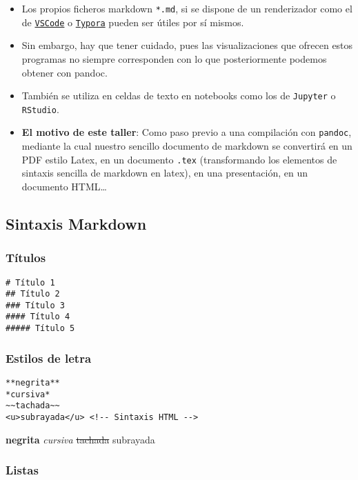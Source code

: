 \documentclass[
  spanish,
]{article}
\providecommand{\tightlist}{%
  \setlength{\itemsep}{0pt}\setlength{\parskip}{0pt}}
\begin{document}
\begin{itemize}
\tightlist
\item
  Los propios ficheros markdown \texttt{*.md}, si se dispone de un
  renderizador como el de
  \href{https://code.visualstudio.com/}{\texttt{VSCode}} o
  \href{https://typora.io/}{\texttt{Typora}} pueden ser útiles por sí
  mismos.
\item
  Sin embargo, hay que tener cuidado, pues las visualizaciones que
  ofrecen estos programas no siempre corresponden con lo que
  posteriormente podemos obtener con pandoc.
\item
  También se utiliza en celdas de texto en notebooks como los de
  \texttt{Jupyter} o \texttt{RStudio}.
\item
  \textbf{El motivo de este taller}: Como paso previo a una compilación
  con \texttt{pandoc}, mediante la cual nuestro sencillo documento de
  markdown se convertirá en un PDF estilo Latex, en un documento
  \texttt{.tex} (transformando los elementos de sintaxis sencilla de
  markdown en latex), en una presentación, en un documento HTML\ldots{}
\end{itemize}

\subsection{Sintaxis Markdown}\label{sintaxis-markdown}

\subsubsection{Títulos}\label{tuxedtulos}

\begin{verbatim}
# Título 1
## Título 2
### Título 3
#### Título 4
##### Título 5
\end{verbatim}

\subsubsection{Estilos de letra}\label{estilos-de-letra}

\begin{verbatim}
**negrita**
*cursiva*
~~tachada~~
<u>subrayada</u> <!-- Sintaxis HTML -->
\end{verbatim}

\textbf{negrita} \emph{cursiva} \st{tachada} subrayada

\subsubsection{Listas}\label{listas}
\end{document}
